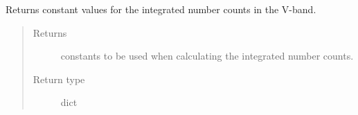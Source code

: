 \documentclass[a4paper,11pt,english]{sphinxmanual}
\begin{document}

\begin{fulllineitems}
\label{sources:sources.stellarNumberCounts.integratedCountsVband}
Returns constant values for the integrated number counts in the V-band.
\begin{quote}\begin{description}
\item[{Returns}] \leavevmode
constants to be used when calculating the integrated number counts.

\item[{Return type}] \leavevmode
dict

\end{description}\end{quote}

\end{fulllineitems}

\end{document}
